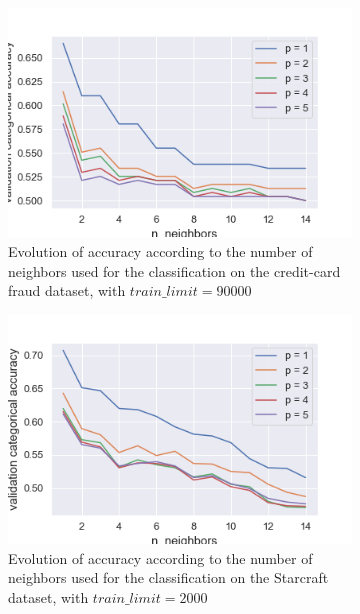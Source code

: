 \documentclass[twocolumn, a4paper, 10pt]{article}
\begin{document}
		\begin{figure}
			\centering
			\begin{subfigure}[]{0.8\columnwidth}
				\centering
				\includegraphics[width=\linewidth]{../graphics/knn_creditcard_neighbors.png}
				\caption{Evolution of accuracy according to the number of neighbors used for the classification on the credit-card fraud dataset, with $train\_limit=90000$}
				\label{knn:knn_cc_neighbors}
			\end{subfigure}
			\begin{subfigure}[]{0.8\columnwidth}
				\centering
				\includegraphics[width=\linewidth]{../graphics/knn_starcraft_neighbors.png}
				\caption{Evolution of accuracy according to the number of neighbors used for the classification on the Starcraft dataset, with $train\_limit=2000$}
				\label{knn:knn_sc_neighbors}
			\end{subfigure}
			\begin{subfigure}[]{0.8\columnwidth}

\end{subfigure}
\end{figure}
\end{document}
